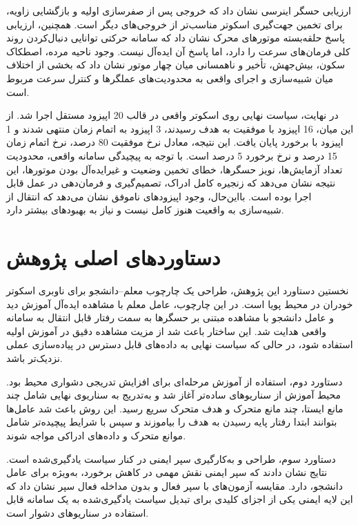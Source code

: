 ارزیابی حسگر اینرسی نشان داد که خروجی  پس از صفرسازی اولیه و بازگشایی زاویه، برای تخمین جهت‌گیری اسکوتر مناسب‌تر از خروجی‌های دیگر است. همچنین، ارزیابی پاسخ حلقه‌بسته موتورهای محرک نشان داد که سامانه حرکتی توانایی دنبال‌کردن روند کلی فرمان‌های سرعت را دارد، اما پاسخ آن ایده‌آل نیست. وجود ناحیه مرده، اصطکاک سکون، بیش‌جهش، تأخیر و ناهمسانی میان چهار موتور نشان داد که بخشی از اختلاف میان شبیه‌سازی و اجرای واقعی به محدودیت‌های عملگرها و کنترل سرعت مربوط است.

در نهایت، سیاست نهایی روی اسکوتر واقعی در قالب 20 اپیزود مستقل اجرا شد. از این میان، 16 اپیزود با موفقیت به هدف رسیدند، 3 اپیزود به اتمام زمان منتهی شدند و 1 اپیزود با برخورد پایان یافت. این نتیجه، معادل نرخ موفقیت 80 درصد، نرخ اتمام زمان 15 درصد و نرخ برخورد 5 درصد است. با توجه به پیچیدگی سامانه واقعی، محدودیت تعداد آزمایش‌ها، نویز حسگرها، خطای تخمین وضعیت و غیرایده‌آل بودن موتورها، این نتیجه نشان می‌دهد که زنجیره کامل ادراک، تصمیم‌گیری و فرمان‌دهی در عمل قابل اجرا بوده است. بااین‌حال، وجود اپیزودهای ناموفق نشان می‌دهد که انتقال از شبیه‌سازی به واقعیت هنوز کامل نیست و نیاز به بهبودهای بیشتر دارد.

\section{دستاوردهای اصلی پژوهش}
\label{sec:main_contributions}

نخستین دستاورد این پژوهش، طراحی یک چارچوب معلم--دانشجو برای ناوبری اسکوتر خودران در محیط پویا است. در این چارچوب، عامل معلم با مشاهده ایده‌آل آموزش دید و عامل دانشجو با مشاهده مبتنی بر حسگرها به سمت رفتار قابل انتقال به سامانه واقعی هدایت شد. این ساختار باعث شد از مزیت مشاهده دقیق در آموزش اولیه استفاده شود، در حالی که سیاست نهایی به داده‌های قابل دسترس در پیاده‌سازی عملی نزدیک‌تر باشد.

دستاورد دوم، استفاده از آموزش مرحله‌ای برای افزایش تدریجی دشواری محیط بود. محیط آموزش از سناریوهای ساده‌تر آغاز شد و به‌تدریج به سناریوی نهایی شامل چند مانع ایستا، چند مانع متحرک و هدف متحرک سریع رسید. این روش باعث شد عامل‌ها بتوانند ابتدا رفتار پایه رسیدن به هدف را بیاموزند و سپس با شرایط پیچیده‌تر شامل موانع متحرک و داده‌های ادراکی مواجه شوند.

دستاورد سوم، طراحی و به‌کارگیری سپر ایمنی در کنار سیاست یادگیری‌شده است. نتایج نشان دادند که سپر ایمنی نقش مهمی در کاهش برخورد، به‌ویژه برای عامل دانشجو، دارد. مقایسه آزمون‌های با سپر فعال و بدون مداخله فعال سپر نشان داد که این لایه ایمنی یکی از اجزای کلیدی برای تبدیل سیاست یادگیری‌شده به یک سامانه قابل استفاده در سناریوهای دشوار است.


